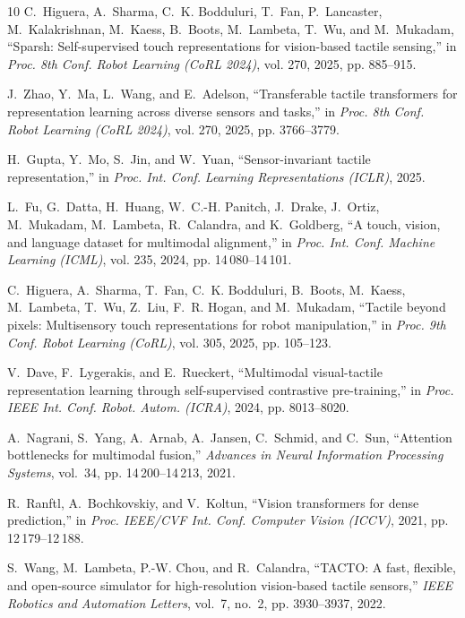 \documentclass[letterpaper,10pt,conference]{ieeeconf}
\begin{document}
\begin{thebibliography}{10}
C.~Higuera, A.~Sharma, C.~K. Bodduluri, T.~Fan, P.~Lancaster, M.~Kalakrishnan,
  M.~Kaess, B.~Boots, M.~Lambeta, T.~Wu, and M.~Mukadam, ``{Sparsh}:
  Self-supervised touch representations for vision-based tactile sensing,'' in
  \emph{Proc. 8th Conf. Robot Learning (CoRL 2024)}, vol. 270, 2025, pp. 885--915.

J.~Zhao, Y.~Ma, L.~Wang, and E.~Adelson, ``Transferable tactile transformers
  for representation learning across diverse sensors and tasks,'' in
  \emph{Proc. 8th Conf. Robot Learning (CoRL 2024)}, vol. 270, 2025, pp. 3766--3779.

H.~Gupta, Y.~Mo, S.~Jin, and W.~Yuan, ``Sensor-invariant tactile
  representation,'' in \emph{Proc. Int. Conf.} \emph{Learning Representations (ICLR)},
  2025.

L.~Fu, G.~Datta, H.~Huang, W.~C.-H. Panitch, J.~Drake, J.~Ortiz, M.~Mukadam,
  M.~Lambeta, R.~Calandra, and K.~Goldberg, ``A touch, vision, and language
  dataset for multimodal alignment,'' in \emph{Proc. Int. Conf. Machine
  Learning (ICML)}, vol. 235,
  2024, pp. 14\,080--14\,101.

C.~Higuera, A.~Sharma, T.~Fan, C.~K. Bodduluri, B.~Boots, M.~Kaess, M.~Lambeta,
  T.~Wu, Z.~Liu, F.~R. Hogan, and M.~Mukadam, ``Tactile beyond pixels:
  Multisensory touch representations for robot manipulation,'' in \emph{Proc.
  9th Conf. Robot Learning (CoRL)}, vol. 305, 2025, pp. 105--123.

V.~Dave, F.~Lygerakis, and E.~Rueckert, ``Multimodal visual-tactile
  representation learning through self-supervised contrastive pre-training,''
  in \emph{Proc. IEEE Int. Conf. Robot. Autom. (ICRA)}, 2024, pp.
  8013--8020.

A.~Nagrani, S.~Yang, A.~Arnab, A.~Jansen, C.~Schmid, and C.~Sun,
``Attention bottlenecks for multimodal fusion,'' \emph{Advances in Neural
Information Processing Systems}, vol.~34, pp. 14\,200--14\,213, 2021.

R.~Ranftl, A.~Bochkovskiy, and V.~Koltun, ``Vision transformers for dense
  prediction,'' in \emph{Proc. IEEE/CVF Int. Conf. Computer} \emph{Vision (ICCV)},
  2021, pp. 12\,179--12\,188.

S.~Wang, M.~Lambeta, P.-W. Chou, and R.~Calandra, ``{TACTO}: A fast, flexible,
  and open-source simulator for high-resolution vision-based tactile sensors,''
  \emph{IEEE Robotics and Automation} \emph{Letters}, vol.~7, no.~2, pp. 3930--3937,
  2022.


\end{thebibliography}
\end{document}
